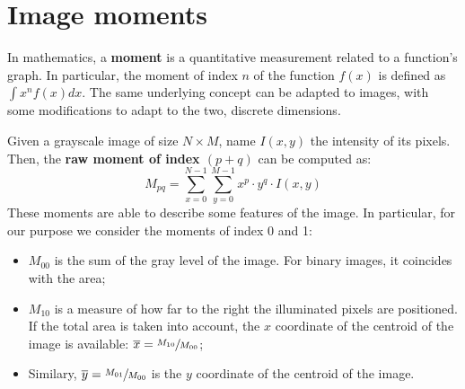 \section{Image moments}
\label{sec:backgr:moments}

In mathematics, a \textbf{moment} is a quantitative measurement related to a function's graph.
In particular, the moment of index $n$ of the function $f(x)$ is defined as $\int x^n f(x) dx$.
The same underlying concept can be adapted to images, with some modifications to adapt to the two, discrete dimensions.

Given a grayscale image of size $N{\times}M$, name $I(x,y)$ the intensity of its pixels.
Then, the \textbf{raw moment of index $(p{+}q)$} can be computed as: $$M_{pq} = \sum_{x=0}^{N-1} \sum_{y=0}^{M-1} x^p{\cdot}y^q{\cdot}I(x,y)$$
These moments are able to describe some features of the image.
In particular, for our purpose we consider the moments of index 0 and 1:
\begin{itemize}
	\itemsep 0em
	\item $M_{00}$ is the sum of the gray level of the image. For binary images, it coincides with the area;
	\item $M_{10}$ is a measure of how far to the right the illuminated pixels are positioned. If the total area is taken into account, the $x$ coordinate of the centroid of the image is available: $\overline{x} = \sfrac{M_{10}}{M_{00}}$;
	\item Similary, $\overline{y} = \sfrac{M_{01}}{M_{00}}$ is the $y$ coordinate of the centroid of the image.
\end{itemize}

